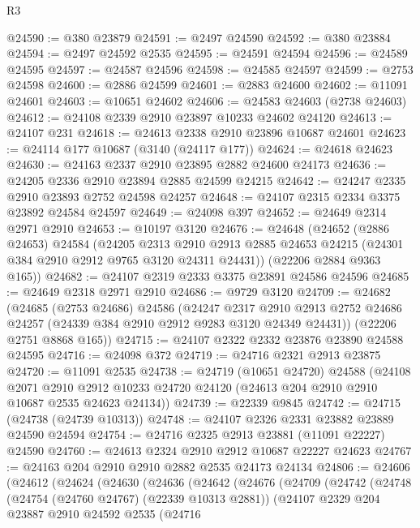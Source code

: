 \begin{lexlean}{R3}
\begin{coremodule}
@24590 := @380 @23879
@24591 := @2497 @24590
@24592 := @380 @23884
@24594 := @2497 @24592 @2535
@24595 := @24591 @24594
@24596 := @24589 @24595
@24597 := @24587 @24596
@24598 := @24585 @24597
@24599 := @2753 @24598
@24600 := @2886 @24599
@24601 := @2883 @24600
@24602 := @11091 @24601
@24603 := @10651 @24602
@24606 := @24583 @24603 (@2738 @24603)
@24612 := @24108 @2339 @2910 @23897 @10233 @24602 @24120
@24613 := @24107 @231
@24618 := @24613 @2338 @2910 @23896 @10687 @24601
@24623 := @24114 @177 @10687 (@3140 (@24117 @177))
@24624 := @24618 @24623
@24630 := @24163 @2337 @2910 @23895 @2882 @24600 @24173
@24636 := @24205 @2336 @2910 @23894 @2885 @24599 @24215
@24642 := @24247 @2335 @2910 @23893 @2752 @24598 @24257
@24648 := @24107 @2315 @2334 @3375 @23892 @24584 @24597
@24649 := @24098 @397
@24652 := @24649 @2314 @2971 @2910
@24653 := @10197 @3120
@24676 := @24648
    (@24652
      (@2886 @24653)
      @24584
      (@24205
        @2313
        @2910
        @2913
        @2885
        @24653
        @24215
        (@24301 @384 @2910 @2912 @9765 @3120 @24311 @24431))
      (@22206 @2884 @9363 @165))
@24682 := @24107 @2319 @2333 @3375 @23891 @24586 @24596
@24685 := @24649 @2318 @2971 @2910
@24686 := @9729 @3120
@24709 := @24682
    (@24685
      (@2753 @24686)
      @24586
      (@24247
        @2317
        @2910
        @2913
        @2752
        @24686
        @24257
        (@24339 @384 @2910 @2912 @9283 @3120 @24349 @24431))
      (@22206 @2751 @8868 @165))
@24715 := @24107 @2322 @2332 @23876 @23890 @24588 @24595
@24716 := @24098 @372
@24719 := @24716 @2321 @2913 @23875
@24720 := @11091 @2535
@24738 := @24719
    (@10651 @24720)
    @24588
    (@24108
      @2071
      @2910
      @2912
      @10233
      @24720
      @24120
      (@24613 @204 @2910 @2910 @10687 @2535 @24623 @24134))
@24739 := @22339 @9845
@24742 := @24715 (@24738 (@24739 @10313))
@24748 := @24107 @2326 @2331 @23882 @23889 @24590 @24594
@24754 := @24716 @2325 @2913 @23881 (@11091 @22227) @24590
@24760 := @24613 @2324 @2910 @2912 @10687 @22227 @24623
@24767 := @24163 @204 @2910 @2910 @2882 @2535 @24173 @24134
@24806 := @24606
    (@24612
      (@24624
        (@24630
          (@24636
            (@24642
              (@24676
                (@24709
                  (@24742
                    (@24748
                      (@24754 (@24760 @24767) (@22339 @10313 @2881))
                      (@24107
                        @2329
                        @204
                        @23887
                        @2910
                        @24592
                        @2535
                        (@24716

\end{coremodule}
\end{lexlean}
